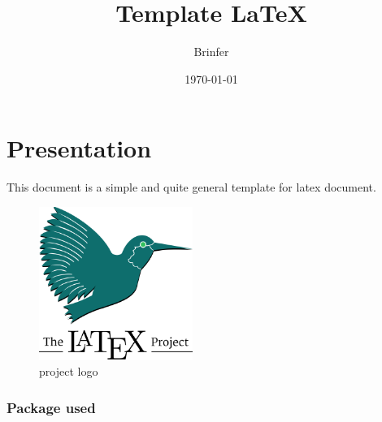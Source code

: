\documentclass[a4paper, 11pt]{article}
\author{Brinfer}
\title{Template \LaTeX}
\date{\normalsize\today} %
\begin{document}
\maketitle

\newpage
{} %
\tableofcontents

\newpage
\part{Presentation}
This document is a simple and quite general template for \gls{latex} document.

\begin{figure}[H]
    \centering
    \includegraphics[width=5cm]{figures/logo/logoLatex.png}
    \caption{ project logo}
    \label{fig:latexProject}
\end{figure}

\section{Package used}
\end{document}
